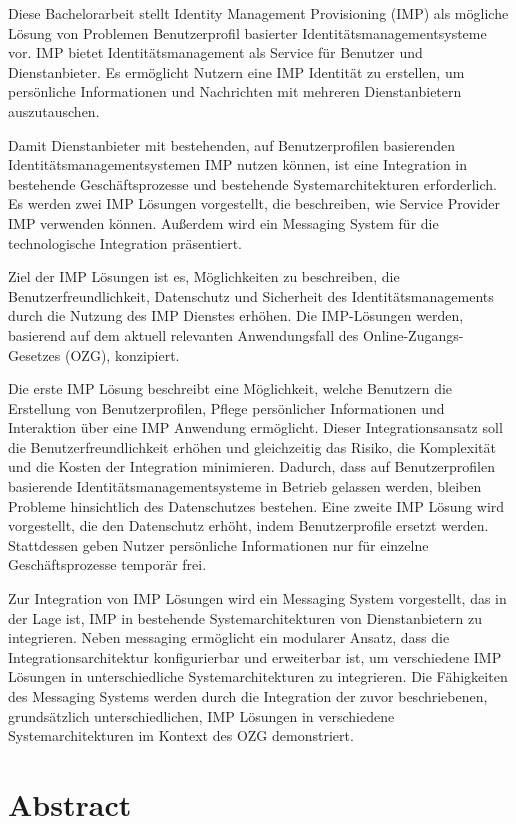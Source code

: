 \documentclass[
     12pt,         %
     a4paper,      %
     BCOR=10mm,version=first,     %
     DIV=14,version=first,        %
     ]{scrreprt}
\begin{document}
Diese Bachelorarbeit stellt Identity Management Provisioning (IMP) als mögliche Lösung von Problemen Benutzerprofil basierter Identitätsmanagementsysteme vor. IMP bietet Identitätsmanagement als Service für Benutzer und Dienstanbieter. Es ermöglicht Nutzern eine IMP Identität zu erstellen, um persönliche Informationen und Nachrichten mit mehreren Dienstanbietern auszutauschen.

Damit Dienstanbieter mit bestehenden, auf Benutzerprofilen basierenden Identitätsmanagementsystemen IMP nutzen können, ist eine Integration in bestehende Geschäftsprozesse und bestehende Systemarchitekturen erforderlich. Es werden zwei IMP Lösungen vorgestellt, die beschreiben, wie Service Provider IMP verwenden können. Außerdem wird ein Messaging System für die technologische Integration präsentiert.

Ziel der IMP Lösungen ist es, Möglichkeiten zu beschreiben, die Benutzerfreundlichkeit, Datenschutz und Sicherheit des Identitätsmanagements durch die Nutzung des IMP Dienstes erhöhen. Die IMP-Lösungen werden, basierend auf dem aktuell relevanten Anwendungsfall des Online-Zugangs-Gesetzes (OZG), konzipiert.

Die erste IMP Lösung beschreibt eine Möglichkeit, welche Benutzern die Erstellung von Benutzerprofilen, Pflege persönlicher Informationen und Interaktion über eine IMP Anwendung ermöglicht. Dieser Integrationsansatz soll die Benutzerfreundlichkeit erhöhen und gleichzeitig das Risiko, die Komplexität und die Kosten der Integration minimieren. Dadurch, dass auf Benutzerprofilen basierende Identitätsmanagementsysteme in Betrieb gelassen werden, bleiben Probleme hinsichtlich des Datenschutzes bestehen. Eine zweite IMP Lösung wird vorgestellt, die den Datenschutz erhöht, indem Benutzerprofile ersetzt werden. Stattdessen geben Nutzer persönliche Informationen nur für einzelne Geschäftsprozesse temporär frei.   

Zur Integration von IMP Lösungen wird ein Messaging System vorgestellt, das in der Lage ist, IMP in bestehende Systemarchitekturen von Dienstanbietern zu integrieren. Neben messaging ermöglicht ein modularer Ansatz, dass die Integrationsarchitektur konfigurierbar und erweiterbar ist, um verschiedene IMP Lösungen in unterschiedliche Systemarchitekturen zu integrieren. Die Fähigkeiten des Messaging Systems werden durch die Integration der zuvor beschriebenen, grundsätzlich unterschiedlichen, IMP Lösungen in verschiedene Systemarchitekturen im Kontext des OZG demonstriert.

\chapter*{Abstract}
\end{document}
